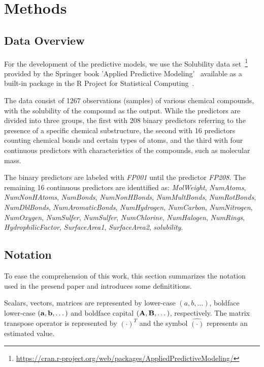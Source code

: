\section{Methods}

\subsection{Data Overview}
For the development of the predictive models, we use the Solubility data set~\footnote{\url{https://cran.r-project.org/web/packages/AppliedPredictiveModeling/}} provided by the Springer book 'Applied Predictive Modeling'~\cite{Kuhn2013} available as a built-in package in the R Project for Statistical Computing~\cite{Rproject2022}. 

The data consist of 1267 observations (samples) of various chemical compounds, with the solubility of the compound as the output. While the predictors are divided into three groups, the first with 208 binary predictors referring to the presence of a specific chemical substructure, the second with 16 predictors counting chemical bonds and certain types of atoms, and the third with four continuous predictors with characteristics of the compounds, such as molecular mass. 

The binary predictors are labeled with \textit{FP001} until the predictor \textit{FP208}. The remaining 16 continuous predictors are identtified as: \textit{MolWeight}, \textit{NumAtoms}, \textit{NumNonHAtoms}, \textit{NumBonds}, \textit{NumNonHBonds}, \textit{NumMultBonds}, \textit{NumRotBonds}, \textit{NumDblBonds}, \textit{NumAromaticBonds}, \textit{NumHydrogen}, \textit{NumCarbon}, \textit{NumNitrogen}, \textit{NumOxygen}, \textit{NumSulfer}, \textit{NumSulfer}, \textit{NumChlorine}, \textit{NumHalogen}, \textit{NumRings}, \textit{HydrophilicFactor}, \textit{SurfaceArea1}, \textit{SurfaceArea2}, \textit{solubility}.

\subsection{Notation}
To ease the comprehension of this work, this section summarizes the notation used in the presend paper and introduces some definititions.

Scalars, vectors, matrices are represented by lower-case $(a, b, \dots)$, boldface lower-case $({\bf a}, {\bf b}, \dots)$ and boldface capital $({\bf A}, {\bf B}, \dots)$, respectively. The matrix transpose operator is represented by $(\cdot)^T$ and the symbol $\hat{(\cdot)}$ represents an estimated value.

